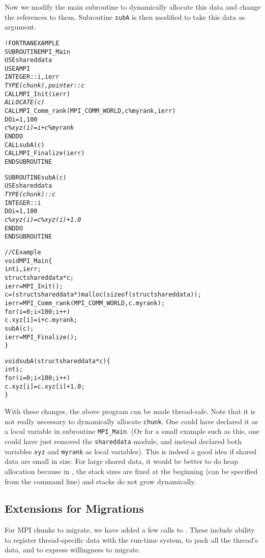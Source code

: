 \documentclass[10pt]{article}
\begin{document}
Now we modify the main subroutine to dynamically allocate this data and change the
references to them. Subroutine \texttt{subA} is then modified to take this data
as argument. 

\begin{alltt}
!FORTRAN EXAMPLE
SUBROUTINE MPI_Main
  USE shareddata
  USE AMPI
  INTEGER :: i, ierr
  \emph{TYPE(chunk), pointer :: c}
  CALL MPI_Init(ierr)
  \emph{ALLOCATE(c)}
  CALL MPI_Comm_rank(MPI_COMM_WORLD, c\%myrank, ierr)
  DO i = 1, 100
    \emph{c\%xyz(i) =  i + c\%myrank}
  END DO
  CALL subA(c)
  CALL MPI_Finalize(ierr)
END SUBROUTINE

SUBROUTINE subA(c)
  USE shareddata
  \emph{TYPE(chunk) :: c}
  INTEGER :: i
  DO i = 1, 100
    \emph{c\%xyz(i) = c\%xyz(i) + 1.0}
  END DO
END SUBROUTINE

//C Example
void MPI_Main\{
  int i,ierr;
  struct shareddata *c;
  ierr = MPI_Init();
  c = (struct shareddata*)malloc(sizeof(struct shareddata));
  ierr = MPI_Comm_rank(MPI_COMM_WORLD, c.myrank);
  for(i=0;i<100;i++)
    c.xyz[i] = i + c.myrank;
  subA(c);
  ierr = MPI_Finalize();
\}

void subA(struct shareddata *c)\{
  int i;
  for(i=0;i<100;i++)
    c.xyz[i] = c.xyz[i] + 1.0;
\}
\end{alltt}

With these changes, the above program can be made thread-safe. Note that it is
not really necessary to dynamically allocate \texttt{chunk}. One could have
declared it as a local variable in subroutine \texttt{MPI\_Main}.  (Or for a
small example such as this, one could have just removed the \texttt{shareddata}
module, and instead declared both variables \texttt{xyz} and \texttt{myrank} as
local variables). This is indeed a good idea if shared data are small in size.
For large shared data, it would be better to do heap allocation because in
\ampi{}, the stack sizes are fixed at the beginning (can be specified from the
command line) and stacks do not grow dynamically.



\subsection{Extensions for Migrations}

For MPI chunks to migrate, we have added a few calls to \ampi{}. These include
ability to register thread-specific data with the run-time system, to pack all
the thread's data, and to express willingness to migrate.
\end{document}
